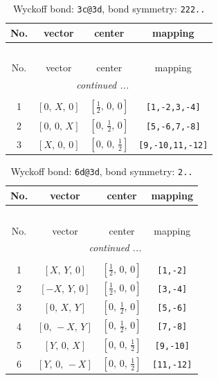 \documentclass[fleqn,8pt]{jsarticle}
\begin{document}
\renewcommand{\arraystretch}{1.2}
\begin{longtable}{cccc}
\caption{Wyckoff bond: {\tt 3c@3d}, bond symmetry: {\tt 222..}}
 \\
 \hline \hline
No. & vector & center & mapping \\ \hline \endfirsthead

\multicolumn{3}{l}{\tablename\ \thetable{}} \\
 \hline \hline
No. & vector & center & mapping \\ \hline \endhead

 \hline \hline
\multicolumn{3}{r}{\footnotesize\it continued ...} \\ \endfoot

 \hline \hline
\multicolumn{3}{r}{} \\ \endlastfoot

1 & $\left[ 0,\, X,\, 0 \right]$ & $\left[ \frac{1}{2},\, 0,\, 0 \right]$ & {\tt [1,-2,3,-4]} \\ \hline
2 & $\left[ 0,\, 0,\, X \right]$ & $\left[ 0,\, \frac{1}{2},\, 0 \right]$ & {\tt [5,-6,7,-8]} \\ \hline
3 & $\left[ X,\, 0,\, 0 \right]$ & $\left[ 0,\, 0,\, \frac{1}{2} \right]$ & {\tt [9,-10,11,-12]} \\
\end{longtable}
\renewcommand{\arraystretch}{1.2}
\begin{longtable}{cccc}
\caption{Wyckoff bond: {\tt 6d@3d}, bond symmetry: {\tt 2..}}
 \\
 \hline \hline
No. & vector & center & mapping \\ \hline \endfirsthead

\multicolumn{3}{l}{\tablename\ \thetable{}} \\
 \hline \hline
No. & vector & center & mapping \\ \hline \endhead

 \hline \hline
\multicolumn{3}{r}{\footnotesize\it continued ...} \\ \endfoot

 \hline \hline
\multicolumn{3}{r}{} \\ \endlastfoot

1 & $\left[ X,\, Y,\, 0 \right]$ & $\left[ \frac{1}{2},\, 0,\, 0 \right]$ & {\tt [1,-2]} \\ \hline
2 & $\left[ - X,\, Y,\, 0 \right]$ & $\left[ \frac{1}{2},\, 0,\, 0 \right]$ & {\tt [3,-4]} \\ \hline
3 & $\left[ 0,\, X,\, Y \right]$ & $\left[ 0,\, \frac{1}{2},\, 0 \right]$ & {\tt [5,-6]} \\ \hline
4 & $\left[ 0,\, - X,\, Y \right]$ & $\left[ 0,\, \frac{1}{2},\, 0 \right]$ & {\tt [7,-8]} \\ \hline
5 & $\left[ Y,\, 0,\, X \right]$ & $\left[ 0,\, 0,\, \frac{1}{2} \right]$ & {\tt [9,-10]} \\ \hline
6 & $\left[ Y,\, 0,\, - X \right]$ & $\left[ 0,\, 0,\, \frac{1}{2} \right]$ & {\tt [11,-12]} \\
\end{longtable}
\end{document}
